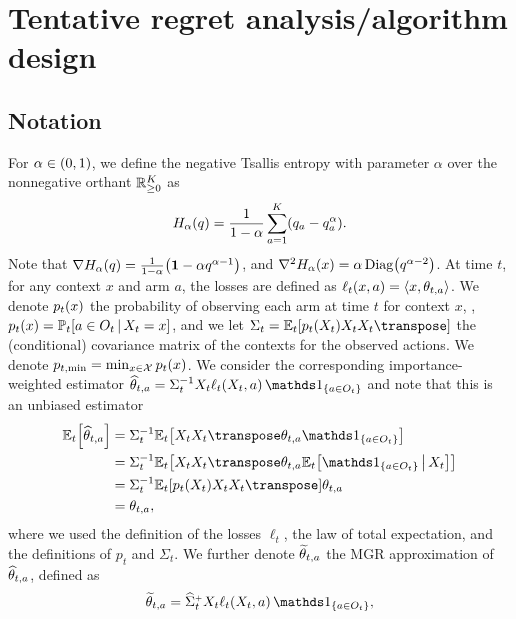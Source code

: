 \section{Tentative regret analysis/algorithm design}

    \subsection{Notation}

 For $\alpha \in \spr*{0, 1}$, we define the negative Tsallis entropy with parameter $\alpha$ over the nonnegative orthant $\bbRnnK$ as
%
\begin{equation*}
    H_\alpha \spr*{q} = \frac{1}{1 - \alpha} \sumaK \spr*{q_a - q_a^\alpha}.
\end{equation*}
%
Note that $\nabla H_\alpha \spr*{q} = \frac{1}{1 - \alpha} \spr*{\bfone - \alpha q^{\alpha - 1}}$, and $\nabla^2 H_\alpha \spr*{x} = \alpha \Diag \spr*{q^{\alpha - 2}}$. At time $t$, for any context $x$ and arm $a$, the losses are defined as $\ell_t \spr*{x, a} = \inp*{x, \theta_{t, a}}$. We denote $p_t \spr*{x}$ the probability of observing each arm at time $t$ for context $x$, \ie, $p_t \spr*{x} = \bbP_t \sbr*{a \in O_t \given X_t = x}$, and we let $\Sigma_t = \bbE_t \sbr*{p_t \spr*{X_t} X_t X_t\transpose}$ the (conditional) covariance matrix of the contexts for the observed actions. We denote $\ptmin = \min_{x \in \cX} p_t \spr*{x}$. We consider the corresponding importance-weighted estimator $\wh{\theta}_{t, a} = \Sigma_t^{-1} X_t \ell_t \spr*{X_t, a} \, \ind_{\scbr*{a \in O_t}}$ and note that this is an unbiased estimator
%
\begin{align*}
    \bbE_t \sbr*{\wh{\theta}_{t, a}} &= \Sigma_t^{-1} \bbE_t \sbr*{X_t X_t\transpose \theta_{t, a} \ind_{\scbr*{a \in O_t}}}\\
    &= \Sigma_t^{-1} \bbE_t \sbr*{X_t X_t\transpose \theta_{t, a} \bbE_t \sbr*{\ind_{\scbr*{a \in O_t}} \given X_t}}\\
    &= \Sigma_t^{-1} \bbE_t \sbr*{p_t \spr*{X_t} X_t X_t\transpose} \theta_{t, a}\\
    &= \theta_{t, a},
\end{align*}
%
where we used the definition of the losses $\ell_t$, the law of total expectation, and the definitions of $p_t$ and $\Sigma_t$. We further denote $\wt{\theta}_{t, a}$ the MGR approximation of $\wh{\theta}_{t, a}$, defined as
%
\begin{equation*}
    \wt{\theta}_{t, a} = \whsigmaplust X_t \ell_t \spr*{X_t, a} \, \ind_{\scbr*{a \in O_t}},
\end{equation*}
